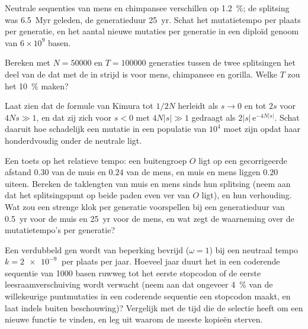 \begin{exercise}[$\star\star$]\label{exo:b3:molecular-evolution:8}
Neutrale sequenties van mens en chimpansee verschillen op
\qty{1.2}{\%}; de splitsing was \qty{6.5}{Myr} geleden, de
generatieduur \qty{25}{yr}. Schat het mutatietempo per plaats per
generatie, en het aantal nieuwe mutaties per generatie in een diploïd
genoom van $6\times 10^{9}$ basen.
\end{exercise}

\begin{exercise}[$\star\star$]\label{exo:b3:molecular-evolution:9}
Bereken met $N = \num{50000}$ en $T = \num{100000}$ generaties tussen
de twee splitsingen het deel van de  dat met de  in
strijd is voor mens, chimpansee en gorilla. Welke $T$ zou het
\qty{10}{\%} maken?
\end{exercise}

\begin{exercise}[$\star\star\star$]\label{exo:b3:molecular-evolution:10}
Laat zien dat de formule van Kimura tot $1/2N$ herleidt als $s \to 0$
en tot $2s$ voor $4Ns \gg 1$, en dat zij zich voor $s < 0$ met
$4N|s| \gg 1$ gedraagt als $2|s|\,\mathrm{e}^{-4N|s|}$. Schat daaruit
hoe schadelijk een mutatie in een populatie van $10^{4}$ moet zijn
opdat haar  honderdvoudig onder de neutrale ligt.
\end{exercise}

\begin{exercise}[$\star\star\star$]\label{exo:b3:molecular-evolution:11}
Een toets op het relatieve tempo: een buitengroep $O$ ligt op een
gecorrigeerde afstand $0.30$ van de muis en $0.24$ van de mens, en muis
en mens liggen $0.20$ uiteen. Bereken de taklengten van muis en mens sinds hun splitsing
(neem aan dat het splitsingspunt op beide paden even ver van
$O$ ligt), en hun verhouding. Wat zou een strenge klok per generatie
voorspellen bij een generatieduur van \qty{0.5}{yr} voor de muis en
\qty{25}{yr} voor de mens, en wat zegt de waarneming over de
mutatietempo's per generatie?
\end{exercise}

\begin{exercise}[$\star\star\star$]\label{exo:b3:molecular-evolution:12}
Een verdubbeld gen wordt van beperking bevrijd ($\omega = 1$) bij een
neutraal tempo $k = \qty{2e-9}{}$ per plaats per jaar. Hoeveel jaar
duurt het in een coderende sequentie van 1000 basen ruwweg tot het
eerste stopcodon of de eerste leesraamverschuiving wordt verwacht (neem
aan dat ongeveer \qty{4}{\%} van de willekeurige puntmutaties in een
coderende sequentie een stopcodon maakt, en laat indels buiten
beschouwing)? Vergelijk met de tijd die de selectie heeft om een nieuwe
functie te vinden, en leg uit waarom de meeste kopieën sterven.
\end{exercise}

